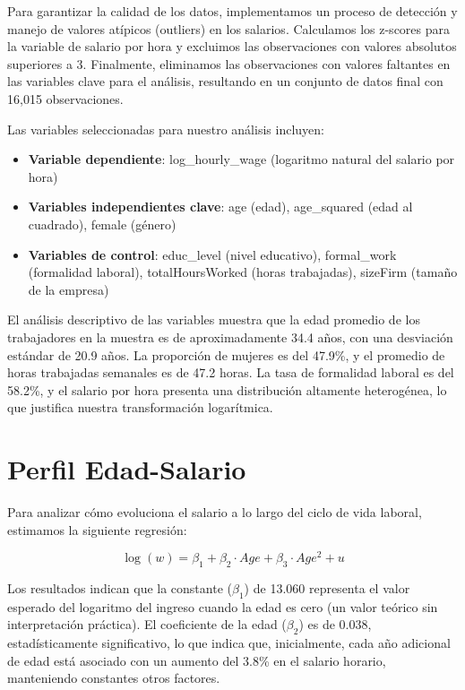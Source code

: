 \documentclass[12pt,a4paper,onecolumn]{article}
\begin{document}
Para garantizar la calidad de los datos, implementamos un proceso de detección y manejo de valores atípicos (outliers) en los salarios. Calculamos los z-scores para la variable de salario por hora y excluimos las observaciones con valores absolutos superiores a 3. Finalmente, eliminamos las observaciones con valores faltantes en las variables clave para el análisis, resultando en un conjunto de datos final con 16,015 observaciones.

Las variables seleccionadas para nuestro análisis incluyen:

\begin{itemize}
    \item \textbf{Variable dependiente}: log\_hourly\_wage (logaritmo natural del salario por hora)
    
    \item \textbf{Variables independientes clave}: age (edad), age\_squared (edad al cuadrado), female (género)
    
    \item \textbf{Variables de control}: educ\_level (nivel educativo), formal\_work (formalidad laboral), totalHoursWorked (horas trabajadas), sizeFirm (tamaño de la empresa)
\end{itemize}

El análisis descriptivo de las variables muestra que la edad promedio de los trabajadores en la muestra es de aproximadamente 34.4 años, con una desviación estándar de 20.9 años. La proporción de mujeres es del 47.9\%, y el promedio de horas trabajadas semanales es de 47.2 horas. La tasa de formalidad laboral es del 58.2\%, y el salario por hora presenta una distribución altamente heterogénea, lo que justifica nuestra transformación logarítmica.

\section{Perfil Edad-Salario}

Para analizar cómo evoluciona el salario a lo largo del ciclo de vida laboral, estimamos la siguiente regresión:

$$ \log(w) = \beta_1 + \beta_2 \cdot Age + \beta_3 \cdot Age^2 + u $$

Los resultados indican que la constante ($\beta_1$) de 13.060 representa el valor esperado del logaritmo del ingreso cuando la edad es cero (un valor teórico sin interpretación práctica). El coeficiente de la edad ($\beta_2$) es de 0.038, estadísticamente significativo, lo que indica que, inicialmente, cada año adicional de edad está asociado con un aumento del 3.8\% en el salario horario, manteniendo constantes otros factores.
\end{document}
